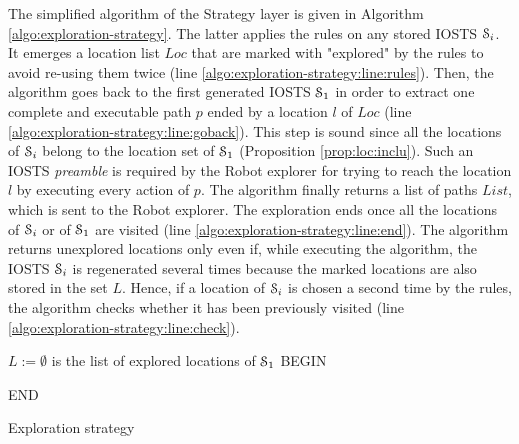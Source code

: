 The simplified algorithm of the Strategy layer is given in
Algorithm \ref{algo:exploration-strategy}. The latter applies the
rules on any stored IOSTS $\EuScript{S}_i$. It emerges a location
list $Loc$ that are marked with "explored" by the rules to avoid
re-using them twice (line
\ref{algo:exploration-strategy:line:rules}). Then, the algorithm
goes back to the first generated IOSTS $\EuScript{S}_1$ in order
to extract one complete and executable path $p$ ended by a
location $l$ of $Loc$ (line
\ref{algo:exploration-strategy:line:goback}). This step is sound
since all the locations of $\EuScript{S}_i$ belong to the
location set of $\EuScript{S}_1$ (Proposition
\ref{prop:loc:inclu}). Such an IOSTS \emph{preamble} is required
by the Robot explorer for trying to reach the location $l$ by
executing every action of $p$. The algorithm finally returns a
list of paths $List$, which is sent to the Robot explorer. The
exploration ends once all the locations of $\EuScript{S}_i$ or of
$\EuScript{S}_1$ are visited (line
\ref{algo:exploration-strategy:line:end}). The algorithm returns
unexplored locations only even if, while executing the algorithm,
the IOSTS $\EuScript{S}_i$ is regenerated several times because
the marked locations are also stored in the set $L$. Hence, if a
location of $\EuScript{S}_i$ is chosen a second time by the
rules, the algorithm checks whether it has been previously
visited (line \ref{algo:exploration-strategy:line:check}).

\begin{algorithm}[h]


$L:=\emptyset$ is the list of explored locations of $\EuScript{S}_1$\;
BEGIN\;

END\;

    \caption{Exploration strategy}
    \label{algo:exploration-strategy}
\end{algorithm}

